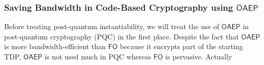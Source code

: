 
\iffalse
\subsubsection{Saving Bandwidth in Code-Based Cryptography using  $\mathsf{OAEP}$}


Before treating post-quantum instantiability, we  will treat  the use of $\mathsf{OAEP}$ in post-quantum cryptography (PQC) in the first place. Despite the fact that $\mathsf{OAEP}$  is  more bandwidth-efficient than $\mathsf{FO}$ because it encrypts part of the starting TDP,  $\mathsf{OAEP}$ is not used much in PQC whereas $\mathsf{FO}$ is pervasive. Actually  


